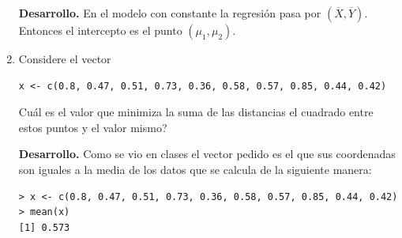\documentclass[11pt,oneside,spanish]{article}
\theoremstyle{definition}
\theoremstyle{definition}\newtheorem{definicion}{Definicin}
\theoremstyle{definition}\newtheorem{ejemplo}{Ejemplo}
\theoremstyle{remark}\newtheorem{nota}{\textsc{Nota}}
\theoremstyle{definition}\newtheorem{proposicion}{Proposicin}
\theoremstyle{definition}\newtheorem{problema}{Problema}
\begin{document}
\begin{enumerate}[(1)]
\textbf{Desarrollo.}
En el modelo con constante la regresi\'on pasa por $(\overline{X},\overline{Y})$. Entonces  el intercepto es el punto $(\mu_1, \mu_2)$.


\item Considere el vector
\begin{lstlisting}[backgroundcolor=\color{Gray!20},frame=none,basicstyle=\ttfamily]
 x <- c(0.8, 0.47, 0.51, 0.73, 0.36, 0.58, 0.57, 0.85, 0.44, 0.42)
\end{lstlisting}
{\textquestiondown}Cu\'al es el valor que minimiza la suma de las distancias el cuadrado entre estos puntos y el valor mismo?

\textbf{Desarrollo.}
Como se vio en clases el vector pedido es el que sus coordenadas son iguales a la media de los datos que se calcula de la siguiente manera:
\begin{lstlisting}[backgroundcolor=\color{Gray!20},frame=none,basicstyle=\ttfamily]
> x <- c(0.8, 0.47, 0.51, 0.73, 0.36, 0.58, 0.57, 0.85, 0.44, 0.42)
> mean(x)
[1] 0.573
\end{lstlisting}

\end{enumerate}
\end{document}
